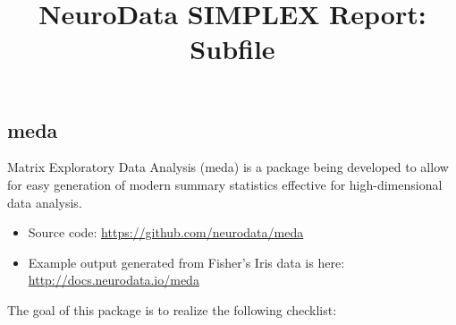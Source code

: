 \documentclass[simplex.tex]{subfiles}
\title{NeuroData SIMPLEX Report: Subfile}
\begin{document}


\subsection{meda}

Matrix Exploratory Data Analysis (meda) is a package being developed to
allow for easy generation of modern summary statistics effective for
high-dimensional data analysis. 

\begin{itemize}
  \item Source code: \href{https://github.com/neurodata/meda}{https://github.com/neurodata/meda}
  \item Example output generated from Fisher's Iris data is here:
    \href{http://docs.neurodata.io/meda}{http://docs.neurodata.io/meda}
\end{itemize}

The goal of this package is to realize the following checklist:
\end{document}

